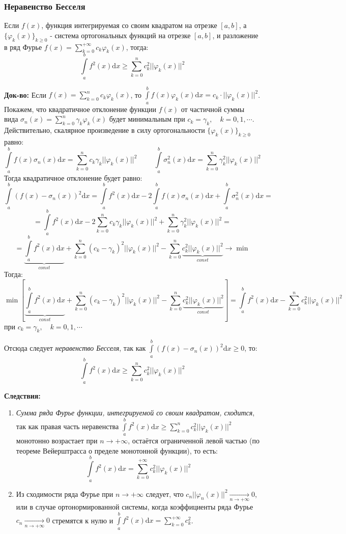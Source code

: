 \documentclass[12pt, a4paper]{article}
\newcommand{\di}{\mathrm{d}}
\newcommand{\const}{\textit{const}}
\begin{document}
\subsubsection{Неравенство Бесселя}

Если $f(x)$, функция интегрируемая со своим квадратом на отрезке $[a, b]$, а $\{\varphi_k(x) \}_{k \geq 0}$ - система ортогональных функций на отрезке $[a, b]$, и разложение в ряд Фурье $f(x) = \sum_{k=0}^{+\infty} c_k \varphi_k(x)$, тогда:
\[\int \limits_a^b f^2(x) \di x \geq \sum_{k=0}^n c^2_k ||\varphi_k(x)||^2 \]

\textbf{Док-во:} Если $f(x) = \sum_{k=0}^n c_k \varphi_k(x)$, то $\int \limits_a^b f(x) \varphi_k(x) \di x = c_k \cdot ||\varphi_k(x)||^2$. Покажем, что квадратичное отклонение функции $f(x)$ от частичной суммы вида $\sigma_n(x) = \sum_{k=0}^n \gamma_k \varphi_k(x)$ будет минимальным при $c_k = \gamma_k, \quad k = 0, 1, \cdots$. Действительно, скалярное произведение в силу ортогональности $\{\varphi_k(x) \}_{k \geq 0}$ равно:
\[\int \limits_a^b f(x) \sigma_n(x) \di x = \sum_{k=0}^n c_k \gamma_k ||\varphi_k(x)||^2 \hspace{1cm} \int \limits_a^b \sigma^2_n(x) \di x = \sum_{k=0}^n \gamma^2_k ||\varphi_k(x)||^2 \]
Тогда квадратичное отклонение будет равно:
\[\int \limits_a^b (f(x) - \sigma_n(x))^2 \di x = \int \limits_a^b f^2(x) \di x - 2\int \limits_a^b f(x) \sigma_n(x) \di x + \int \limits_a^b \sigma_n^2(x) \di x = \]
\[= \int \limits_a^b f^2(x) \di x - 2\sum_{k=0}^n c_k \gamma_k ||\varphi_k(x)||^2 + \sum_{k=0}^n \gamma^2_k ||\varphi_k(x)||^2 = \]
\[= \underbrace{\int \limits_a^b f^2(x) \di x}_{\const} + \sum_{k=0}^n (c_k - \gamma_k)^2 ||\varphi_k(x)||^2 - \sum_{k=0}^n \underbrace{c^2_k ||\varphi_k(x)||^2}_{\const} \to \min \]
Тогда:
\[\min \left[ \underbrace{\int \limits_a^b f^2(x) \di x}_{\const} + \sum_{k=0}^n (c_k - \gamma_k)^2 ||\varphi_k(x)||^2 - \sum_{k=0}^n \underbrace{c^2_k ||\varphi_k(x)||^2}_{\const} \right] = \int \limits_a^b f^2(x) \di x - \sum_{k=0}^n c^2_k ||\varphi_k(x)||^2 \]
при $c_k = \gamma_k, \quad k = 0, 1, \cdots$

Отсюда следует \textit{неравенство Бесселя}, так как $\int \limits_a^b (f(x) - \sigma_n(x))^2 \di x \geq 0$, то:
\[\int \limits_a^b f^2(x) \di x \geq \sum_{k=0}^n c^2_k ||\varphi_k(x)||^2 \]

\textbf{Следствия:}
\begin{enumerate}
 \item \textit{Сумма ряда Фурье функции, интегрируемой со своим квадратом, сходится}, так как правая часть неравенства $\int \limits_a^b f^2(x) \di x \geq \sum_{k=0}^n c^2_k ||\varphi_k(x)||^2$ монотонно возрастает при $n \to +\infty$, остаётся ограниченной левой частью (по теореме Вейерштрасса о пределе монотонной функции), то есть:
 \[\int \limits_a^b f^2(x) \di x = \sum_{k=0}^{+\infty} c^2_k ||\varphi_k(x)||^2 \]
 \item Из сходимости ряда Фурье при $n \to +\infty$ следует, что $c_n ||\varphi_n(x)||^2 \xrightarrow[n \to +\infty]{} 0$, или в случае ортонормированной системы, когда коэффициенты ряда Фурье $c_n \xrightarrow[n \to +\infty]{} 0$ стремятся к нулю и $\int \limits_a^b f^2(x) \di x = \sum_{k=0}^{+\infty} c^2_k$.
\end{enumerate}
\end{document}
